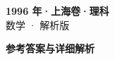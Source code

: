 \documentclass[zihao=-4, a4paper]{ctexart}
\begin{document}
\begin{center}
  {\Large\bfseries 1996 年·上海卷·理科}\\[4pt]
  {\large 数学 · 解析版}
\end{center}
\medskip
{}

\clearpage
{}
\begin{center}{\Large\bfseries 参考答案与详细解析}\end{center}
\medskip

\end{document}
